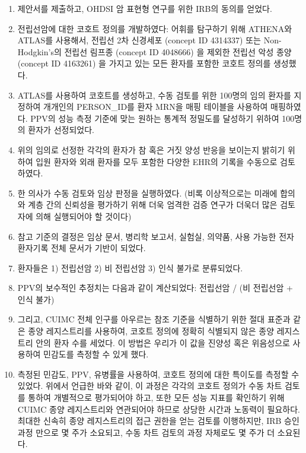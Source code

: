 \documentclass[10.5pt]{book}
\providecommand{\tightlist}{%
  \setlength{\itemsep}{0pt}\setlength{\parskip}{0pt}}
\theoremstyle{definition}
\theoremstyle{definition}
\theoremstyle{definition}
\theoremstyle{remark}
\begin{document}
\begin{enumerate}
\def\labelenumi{\arabic{enumi}.}
\tightlist
\item
  제안서를 제출하고, OHDSI 암 표현형 연구를 위한 IRB의 동의를 얻었다.
\item
  전립선암에 대한 코호트 정의를 개발하였다: 어휘를 탐구하기 위해
  ATHENA와 ATLAS를 사용해서, 전립선 2차 신경세포 (concept ID 4314337)
  또는 Non-Hodgkin's의 전립선 림프종 (concept ID 4048666) 을 제외한
  전립선 악성 종양 (concept ID 4163261) 을 가지고 있는 모든 환자를
  포함한 코호트 정의를 생성했다.
\item
  ATLAS를 사용하여 코호트를 생성하고, 수동 검토를 위한 100명의 임의
  환자를 지정하여 개개인의 PERSON\_ID를 환자 MRN을 매핑 테이블을
  사용하여 매핑하였다. PPV의 성능 측정 기준에 맞는 원하는 통계적
  정밀도를 달성하기 위하여 100명의 환자가 선정되었다.
\item
  위의 임의로 선정한 각각의 환자가 참 혹은 거짓 양성 반응을 보이는지
  밝히기 위하여 입원 환자와 외래 환자를 모두 포함한 다양한 EHR의 기록을
  수동으로 검토하였다.
\item
  한 의사가 수동 검토와 임상 판정을 실행하였다. (비록 이상적으로는
  미래에 합의와 계층 간의 신뢰성을 평가하기 위해 더욱 엄격한 검증 연구가
  더욱더 많은 검토자에 의해 실행되어야 할 것이다)
\item
  참고 기준의 결정은 임상 문서, 병리학 보고서, 실험실, 의약품, 사용
  가능한 전자 환자기록 전체 문서가 기반이 되었다.
\item
  환자들은 1) 전립선암 2) 비 전립선암 3) 인식 불가로 분류되었다.
\item
  PPV의 보수적인 추정치는 다음과 같이 계산되었다: 전립선암 / (비
  전립선암 + 인식 불가)
\item
  그리고, CUIMC 전체 인구를 아우르는 참조 기준을 식별하기 위한 절대
  표준과 같은 종양 레지스트리를 사용하여, 코호트 정의에 정확히 식별되지
  않은 종양 레지스트리 안의 환자 수를 세었다. 이 방법은 우리가 이 값을
  진양성 혹은 위음성으로 사용하여 민감도를 측정할 수 있게 했다.
\item
  측정된 민감도, PPV, 유병률을 사용하여, 코호트 정의에 대한 특이도를
  측정할 수 있었다. 위에서 언급한 바와 같이, 이 과정은 각각의 코호트
  정의가 수동 차트 검토를 통하여 개별적으로 평가되어야 하고, 또한 모든
  성능 지표를 확인하기 위해 CUIMC 종양 레지스트리와 연관되어야 하므로
  상당한 시간과 노동력이 필요하다. 최대한 신속히 종양 레지스트리의 접근
  권한을 얻는 검토를 이행하지만, IRB 승인 과정 만으로 몇 주가 소요되고,
  수동 차트 검토의 과정 자체로도 몇 주가 더 소요된다.
\end{enumerate}
\end{document}

